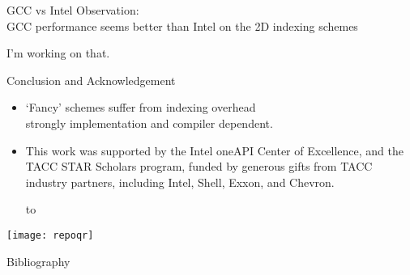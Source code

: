 \documentclass[10pt]{beamer}
\begin{document}
\begin{comment}
  \begin{numberedframe}{Can we use execution policies?}
    \begin{itemize}
    \item Last time I tried there was a compiler issue
    \item That 5-point stencil is hard to express in range views!
    \end{itemize}
  \end{numberedframe}
\end{comment}

\begin{numberedframe}{GCC vs Intel}
  Observation:\\
  GCC performance seems better than Intel
  on the 2D indexing schemes

  I'm working on that.
\end{numberedframe}

\begin{numberedframe}{Conclusion and Acknowledgement}
  \begin{itemize}
  \item `Fancy' schemes suffer from indexing overhead\\
    strongly implementation and compiler dependent.
  \item This work was supported by
    the Intel oneAPI Center of Excellence, and the 
    TACC STAR Scholars program,
    funded by generous gifts from TACC industry partners, including Intel, Shell, Exxon,
    and Chevron.\par
  \hbox to 
  \end{itemize}
  \texttt{[image: repoqr]}
\end{numberedframe}

\begin{numberedframe}{Bibliography}
  
  
\end{numberedframe}
\end{document}

